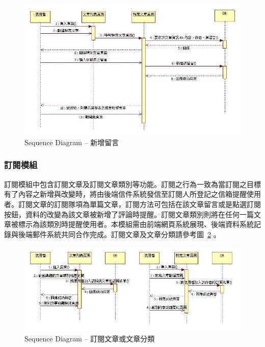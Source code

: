 \begin{figure}[H]
\centering
\includegraphics[width=1.05\textwidth]{img/useseq/stage2/seqNewComment.jpg}
\caption{Sequence Diagram -- 新增留言}
\label{pic:seq:newComment}
\end{figure}

\subsubsection{訂閱模組}
\label{sssec:subscription}
訂閱模組中包含訂閱文章及訂閱文章類別等功能。訂閱之行為一致為當訂閱之目標有了內容之新增與改變時，將由後端信件系統發信至訂閱人所登記之信箱提醒使用者。訂閱文章的訂閱隊項為單篇文章，訂閱方法可包括在該文章留言或是點選訂閱按鈕，資料的改變為該文章被新增了評論時提醒。訂閱文章類別則將在任何一篇文章被標示為該類別時提醒使用者。本模組需由前端網頁系統展現、後端資料系統記錄與後端郵件系統共同合作完成。訂閱文章及文章分類請參考圖~\ref{pic:seq:search} 。

\begin{figure}[H]
\centering
\includegraphics[width=\textwidth]{img/useseq/stage2/seqSearch.jpg}
\caption{Sequence Diagram -- 訂閱文章或文章分類}
\label{pic:seq:search}
\end{figure}

